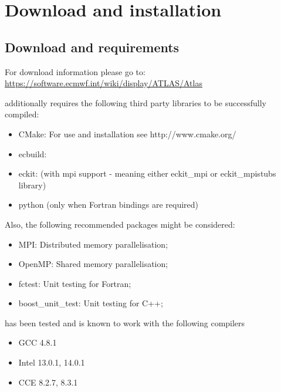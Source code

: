 \chapter{Download and installation}
\label{chap:installation}

\section{Download and requirements}
For download information please go to: \\
\url{https://software.ecmwf.int/wiki/display/ATLAS/Atlas}
 
\Atlas additionally requires the following third party libraries
to be successfully compiled:
%
\begin{itemize}
\item CMake: For use and installation see http://www.cmake.org/
\item ecbuild:
\item eckit: (with mpi support - meaning either eckit\_mpi 
or eckit\_mpistubs library)
\item python (only when Fortran bindings are required)
\end{itemize}
%
Also, the following recommended packages might be considered:
%
\begin{itemize}
\item MPI: Distributed memory parallelisation;
\item OpenMP: Shared memory parallelisation;
\item fctest: Unit testing for Fortran;
\item boost\_unit\_test: Unit testing for C++;
\end{itemize}
%
\Atlas has been tested and is known to work with the following compilers
%
\begin{itemize}
\item GCC 4.8.1
\item Intel 13.0.1, 14.0.1
\item CCE 8.2.7, 8.3.1
\end{itemize}
%




